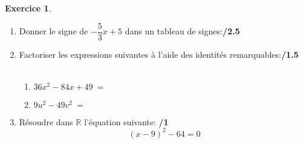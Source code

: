 \documentclass[a4paper,10pt]{article}
\theoremstyle{definition}
\newtheorem{exo}{Exercice}
\newcommand{\R}{\mathbb{R}}
\begin{document}
\begin{exo}
\begin{enumerate}
	\newpage
	\item Donner le signe de $-\dfrac{5}{3}x+5$ dans un tableau de signes:\hfill\textbf{/2.5}\\\bigskip \bigskip \bigskip \bigskip \bigskip \bigskip \bigskip \bigskip \bigskip \bigskip 
\bigskip \bigskip \bigskip \bigskip \bigskip \bigskip \bigskip \bigskip \bigskip \bigskip \bigskip \bigskip \bigskip 
	\item Factoriser les expressions suivantes à l'aide des identités remarquables:\hfill\textbf{/1.5}\\ \\[0.5cm]
	\begin{enumerate}
		\item $36x^2 - 84x + 49 \ = \ $\bigskip \bigskip \bigskip \bigskip \bigskip \bigskip \bigskip \bigskip \bigskip \bigskip 
		\item $ 9u^2 - 49v^2\ = \ $ \bigskip \bigskip \bigskip \bigskip \bigskip \bigskip \bigskip \bigskip 
	\end{enumerate}
\item 	Résoudre dans $\R$ l'équation suivante: \hfill\textbf{/1}\\
$$(x-9)^2-64 = 0$$
\end{enumerate}


\end{exo}
\end{document}
